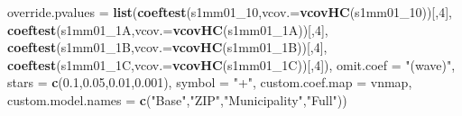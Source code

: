 \documentclass[
]{article}
\newenvironment{Shaded}{\begin{snugshade}}{\end{snugshade}}
\newcommand{\DataTypeTok}[1]{\textcolor[rgb]{0.13,0.29,0.53}{#1}}
\newcommand{\DecValTok}[1]{\textcolor[rgb]{0.00,0.00,0.81}{#1}}
\newcommand{\FloatTok}[1]{\textcolor[rgb]{0.00,0.00,0.81}{#1}}
\newcommand{\KeywordTok}[1]{\textcolor[rgb]{0.13,0.29,0.53}{\textbf{#1}}}
\newcommand{\NormalTok}[1]{#1}
\newcommand{\StringTok}[1]{\textcolor[rgb]{0.31,0.60,0.02}{#1}}
\begin{document}
\begin{Shaded}
\begin{Highlighting}[]
          \DataTypeTok{override.pvalues =} \KeywordTok{list}\NormalTok{(}\KeywordTok{coeftest}\NormalTok{(s1mm01_}\DecValTok{10}\NormalTok{,}\DataTypeTok{vcov.=}\KeywordTok{vcovHC}\NormalTok{(s1mm01_}\DecValTok{10}\NormalTok{))[,}\DecValTok{4}\NormalTok{],}
                                  \KeywordTok{coeftest}\NormalTok{(s1mm01_1A,}\DataTypeTok{vcov.=}\KeywordTok{vcovHC}\NormalTok{(s1mm01_1A))[,}\DecValTok{4}\NormalTok{],}
                                  \KeywordTok{coeftest}\NormalTok{(s1mm01_1B,}\DataTypeTok{vcov.=}\KeywordTok{vcovHC}\NormalTok{(s1mm01_1B))[,}\DecValTok{4}\NormalTok{],}
                                  \KeywordTok{coeftest}\NormalTok{(s1mm01_1C,}\DataTypeTok{vcov.=}\KeywordTok{vcovHC}\NormalTok{(s1mm01_1C))[,}\DecValTok{4}\NormalTok{]),}
          \DataTypeTok{omit.coef =} \StringTok{"(wave)"}\NormalTok{, }\DataTypeTok{stars =} \KeywordTok{c}\NormalTok{(}\FloatTok{0.1}\NormalTok{,}\FloatTok{0.05}\NormalTok{,}\FloatTok{0.01}\NormalTok{,}\FloatTok{0.001}\NormalTok{), }\DataTypeTok{symbol =} \StringTok{"+"}\NormalTok{,}
          \DataTypeTok{custom.coef.map =}\NormalTok{ vnmap, }
          \DataTypeTok{custom.model.names =} \KeywordTok{c}\NormalTok{(}\StringTok{"Base"}\NormalTok{,}\StringTok{"ZIP"}\NormalTok{,}\StringTok{"Municipality"}\NormalTok{,}\StringTok{"Full"}\NormalTok{))}
\end{Highlighting}
\end{Shaded}
\end{document}
